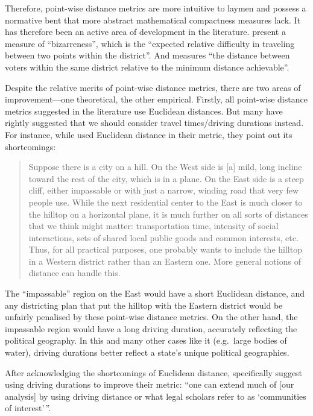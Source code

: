 \documentclass[]{article}
\begin{document}
Therefore, point-wise distance metrics are more intuitive to laymen and
possess a normative bent that more abstract mathematical compactness
measures lack. It has therefore been an active area of development in
the literature. \cite{cm2010} present a measure of ``bizarreness'',
which is the ``expected relative difficulty in traveling between two
points within the district''. And \cite{fh2011} measures ``the distance
between voters within the same district relative to the minimum distance
achievable''.

Despite the relative merits of point-wise distance metrics, there are
two areas of improvement---one theoretical, the other empirical.
Firstly, all point-wise distance metrics suggested in the literature use
Euclidean distances. But many have rightly suggested that we should
consider travel times/driving durations instead. For instance, while
\cite{fh2011} used Euclidean distance in their metric, they point out
its shortcomings:

\begin{quote}
Suppose there is a city on a hill. On the West side is {[}a{]} mild,
long incline toward the rest of the city, which is in a plane. On the
East side is a steep cliff, either impassable or with just a narrow,
winding road that very few people use. While the next residential center
to the East is much closer to the hilltop on a horizontal plane, it is
much further on all sorts of distances that we think might matter:
transportation time, intensity of social interactions, sets of shared
local public goods and common interests, etc. Thus, for all practical
purposes, one probably wants to include the hilltop in a Western
district rather than an Eastern one. More general notions of distance
can handle this.
\end{quote}

The ``impassable'' region on the East would have a short Euclidean
distance, and any districting plan that put the hilltop with the Eastern
district would be unfairly penalised by these point-wise distance
metrics. On the other hand, the impassable region would have a long
driving duration, accurately reflecting the political geography. In this
and many other cases like it (e.g.~large bodies of water), driving
durations better reflect a state's unique political geographies.

After acknowledging the shortcomings of Euclidean distance,
\citeauthor{fh2011} specifically suggest using driving durations to
improve their metric: ``one can extend much of {[}our analysis{]} by
using driving distance or what legal scholars refer to as `communities
of interest'\,''.
\end{document}
